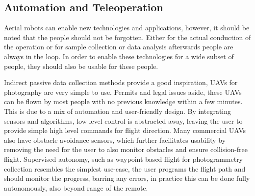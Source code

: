 

\subsection{Automation and Teleoperation}

Aerial robots can enable new technologies and applications, however, it should be noted that the people should not be forgotten. Either for the actual conduction of the operation or for sample collection or data analysis afterwards people are always in the loop. In order to enable these technologies for a wide subset of people, they should also be usable for these people. 

Indirect passive data collection methods provide a good inspiration, UAVs for photography are very simple to use. Permits and legal issues aside, these UAVs can be  flown by most people with no previous knowledge within a few minutes. This is due to a mix of automation and user-friendly design. By integrating sensors and algorithms, low level control is abstracted away, leaving the user to provide simple high level commands for flight direction. Many commercial UAVs also have obstacle avoidance sensors, which further facilitates usability by removing the need for the user to also monitor obstacles and ensure collision-free flight. Supervised autonomy, such as waypoint based flight for photogrammetry collection resembles the simplest use-case, the user programs the flight path and should monitor the progress, barring any errors, in practice this can be done fully autonomously, also beyond range of the remote.

